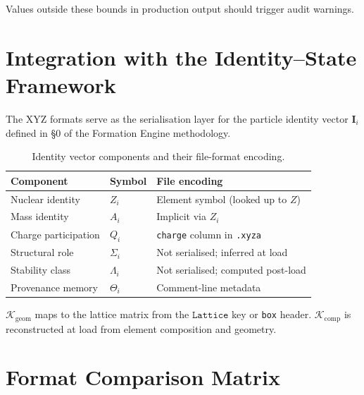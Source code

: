\documentclass[12pt, a4paper, oneside]{article}
\begin{document}
Values outside these bounds in production output should trigger audit warnings.

\section{Integration with the Identity--State Framework}
\label{sec:s0}

The XYZ formats serve as the serialisation layer for the particle
identity vector $\mathbf{I}_i$ defined in \S{}0 of the Formation
Engine methodology.

\begin{table}[htbp]
  \centering
  \caption{Identity vector components and their file-format encoding.}
  \label{tab:s0_map}
  \begin{tabular}{llp{6.5cm}}
    \toprule
    Component & Symbol & File encoding \\
    \midrule
    Nuclear identity     & $Z_i$       & Element symbol (looked up to $Z$) \\
    Mass identity        & $A_i$       & Implicit via $Z_i$ \\
    Charge participation & $Q_i$       & \texttt{charge} column in \texttt{.xyza} \\
    Structural role      & $\Sigma_i$  & Not serialised; inferred at load \\
    Stability class      & $\Lambda_i$ & Not serialised; computed post-load \\
    Provenance memory    & $\Theta_i$  & Comment-line metadata \\
    \bottomrule
  \end{tabular}
\end{table}

$\mathcal{K}_{\text{geom}}$ maps to the lattice matrix from the
$\texttt{Lattice}$ key or \texttt{box} header.
$\mathcal{K}_{\text{comp}}$ is reconstructed at load from element
composition and geometry.

\section{Format Comparison Matrix}
\label{sec:matrix}
\end{document}

